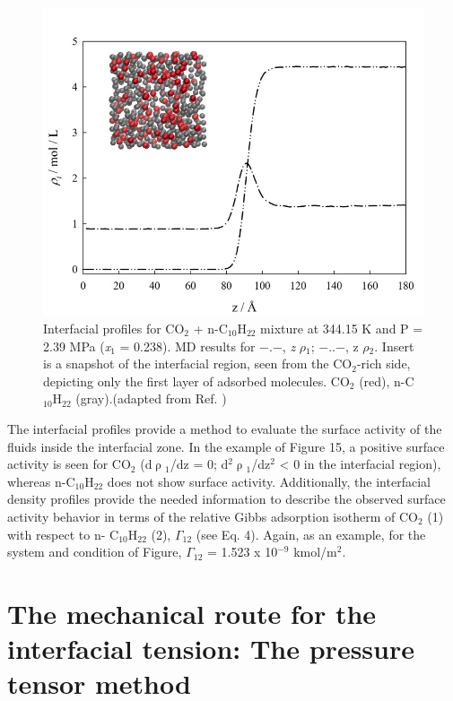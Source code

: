 \documentclass{scrbook}
\begin{document}
\begin{figure}
\includegraphics[width=1\textwidth]{gfx/image54.jpeg}
\caption{Interfacial profiles for CO$_{2}$ + n-C$_{10}$H$_{22}$ mixture at 344.15 K and P = 2.39 MPa (\textit{x}$_{1}$ = 0.238). MD results for ${-}$.${-}$, \textit{z} \textendash{} ${\rho}$$_{1}$; ${-}$..${-}$, z\textendash{} ${\rho}$$_{2}$. Insert is a snapshot of the interfacial region, seen from the CO$_{2}$-rich side, depicting only the first layer of adsorbed molecules. CO$_{2}$ (red), n-C$_{10}$H$_{22}$ (gray).(adapted from Ref. \citep{mejia2014a})}
\label{fig:9}
\end{figure}

The interfacial profiles provide a method to evaluate the surface activity of
the fluids inside the interfacial zone. In the example of Figure 15, a positive
surface activity is seen for CO$_{2}$ (d${\uprho}$$_{1}$/dz = 0;
d$^{2}$${\uprho}$$_{1}$/dz$^{2}$ {\textless} 0 in the interfacial region),
whereas n-C$_{10}$H$_{22}$ does not show surface activity. Additionally, the
interfacial density profiles provide the needed information to describe the
observed surface activity behavior in terms of the relative Gibbs adsorption
isotherm of CO$_{2}$ (1) with respect to n- C$_{10}$H$_{22}$ (2),
${\Gamma}$$_{12}$ (see Eq. 4). Again, as an example, for the system and
condition of Figure, ${\Gamma}$$_{12}$ = 1.523 x 10$^{-9}$
kmol/m$^{2}$\citep{mejia2014a}.

\section{The mechanical route for the interfacial tension: The pressure tensor method}
\end{document}

